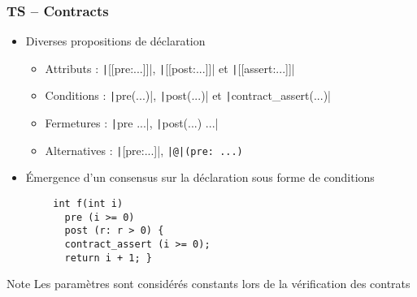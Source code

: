 \documentclass[C++.tex]{subfiles}
\begin{document}
\begin{frame}[fragile]
	\frametitle{TS -- Contracts}
	\begin{itemize}
		\item Diverses propositions de déclaration
		\begin{itemize}
			\item Attributs : \texttt|[[pre:...]]|, \texttt|[[post:...]]| et  \texttt|[[assert:...]]|
			\item Conditions : \texttt|pre(...)|, \texttt|post(...)| et \texttt|contract_assert(...)|
			\item Fermetures : \texttt|pre {...}|, \texttt|post(...) {...}|
			\item Alternatives : \texttt|[{pre:...}]|, \texttt{|@|(pre: ...)}
		\end{itemize}
		\item Émergence d'un consensus sur la déclaration sous forme de conditions
	\end{itemize}

	\begin{verbatim}
		int f(int i)
		  pre (i >= 0)
		  post (r: r > 0) {
		  contract_assert (i >= 0);
		  return i + 1; }
	\end{verbatim}

	\begin{block}{Note}
		Les paramètres sont considérés constants lors de la vérification des contrats
	\end{block}


\end{frame}
\end{document}
